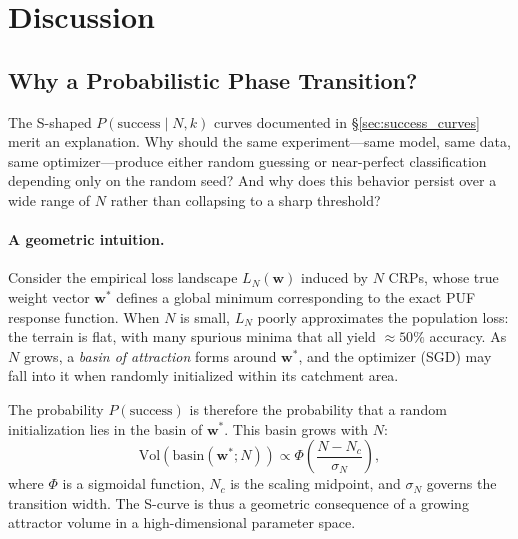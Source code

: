 \section{Discussion}
\label{sec:discussion}

\subsection{Why a Probabilistic Phase Transition?}
\label{sec:why_probabilistic}

The S-shaped $P(\text{success} \mid N, k)$ curves documented in
\S\ref{sec:success_curves} merit an explanation.  Why should the same
experiment---same model, same data, same optimizer---produce either random
guessing or near-perfect classification depending only on the random seed?
And why does this behavior persist over a wide range of $N$ rather than
collapsing to a sharp threshold?

\paragraph{A geometric intuition.}
Consider the empirical loss landscape $L_N(\mathbf{w})$ induced by $N$
CRPs, whose true weight vector $\mathbf{w}^*$ defines a global minimum
corresponding to the exact PUF response function.  When $N$ is small,
$L_N$ poorly approximates the population loss: the terrain is flat,
with many spurious minima that all yield $\approx 50\%$ accuracy.  As $N$
grows, a \emph{basin of attraction} forms around $\mathbf{w}^*$, and the
optimizer (SGD) may fall into it when randomly initialized within its
catchment area.

The probability $P(\text{success})$ is therefore the probability that a
random initialization lies in the basin of $\mathbf{w}^*$.  This basin grows
with $N$:
\[
\text{Vol}(\text{basin}(\mathbf{w}^*; N)) \propto
\Phi\!\left(\frac{N - N_c}{\sigma_N}\right),
\]
where $\Phi$ is a sigmoidal function, $N_c$ is the scaling midpoint, and
$\sigma_N$ governs the transition width.  The S-curve is thus a geometric
consequence of a growing attractor volume in a high-dimensional parameter
space.


